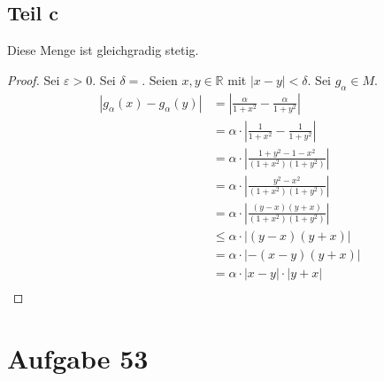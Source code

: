 \documentclass[10pt,a4paper]{article}
\begin{document}
\subsection*{Teil c}

Diese Menge ist gleichgradig stetig.

\begin{proof}
Sei $\varepsilon > 0$.
Sei $\delta = $.
Seien $x, y \in \mathbb{R}$ mit $|x - y| < \delta$.
Sei $g_{\alpha} \in M$.
\begin{align*}
|g_{\alpha}(x) - g_{\alpha}(y)| & = |\frac{\alpha}{1 + x^{2}} - \frac{\alpha}{1 + y^{2}}|\\
& = \alpha \cdot |\frac{1}{1 + x^{2}} - \frac{1}{1 + y^{2}}|\\
& = \alpha \cdot |\frac{1 + y^{2} - 1 - x^{2}}{(1 + x^{2})(1 + y^{2})}|\\
& = \alpha \cdot |\frac{y^{2} - x^{2}}{(1 + x^{2})(1 + y^{2})}|\\
& = \alpha \cdot |\frac{(y - x)(y + x)}{(1 + x^{2})(1 + y^{2})}|\\
& \le \alpha \cdot |(y - x)(y + x)|\\
& = \alpha \cdot |-(x - y)(y + x)|\\
& = \alpha \cdot |x - y| \cdot |y + x|\\
\end{align*}
\end{proof}

\section*{Aufgabe 53}
\end{document}
